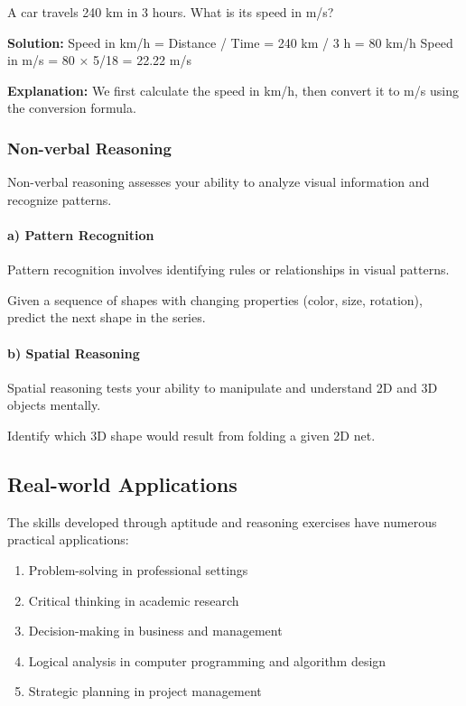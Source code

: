 \begin{example}
A car travels 240 km in 3 hours. What is its speed in m/s?

\textbf{Solution:}
Speed in km/h = Distance / Time = 240 km / 3 h = 80 km/h
Speed in m/s = 80 × 5/18 = 22.22 m/s

\textbf{Explanation:} We first calculate the speed in km/h, then convert it to m/s using the conversion formula.
\end{example}

\subsubsection{Non-verbal Reasoning}

Non-verbal reasoning assesses your ability to analyze visual information
and recognize patterns.

\paragraph{a) Pattern Recognition}

Pattern recognition involves identifying rules or relationships in
visual patterns.

\begin{example}
Given a sequence of shapes with changing properties (color, size, rotation), predict the next shape in the series.
\end{example}

\paragraph{b) Spatial Reasoning}

Spatial reasoning tests your ability to manipulate and understand 2D and
3D objects mentally.

\begin{example}
Identify which 3D shape would result from folding a given 2D net.
\end{example}

\subsection{Real-world Applications}

The skills developed through aptitude and reasoning exercises have
numerous practical applications:

\begin{enumerate}
    \item Problem-solving in professional settings
    \item Critical thinking in academic research
    \item Decision-making in business and management
    \item Logical analysis in computer programming and algorithm design
    \item Strategic planning in project management
\end{enumerate}

